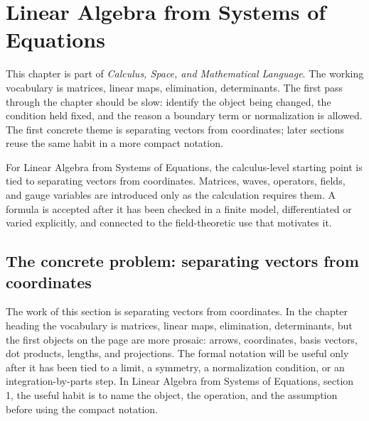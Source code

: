 \chapter{Linear Algebra from Systems of Equations}


This chapter is part of \emph{Calculus, Space, and Mathematical Language}.  The working vocabulary is matrices, linear maps, elimination, determinants.  The first pass through the chapter should be slow: identify the object being changed, the condition held fixed, and the reason a boundary term or normalization is allowed.  The first concrete theme is separating vectors from coordinates; later sections reuse the same habit in a more compact notation.

For Linear Algebra from Systems of Equations, the calculus-level starting point is tied to separating vectors from coordinates.  Matrices, waves, operators, fields, and gauge variables are introduced only as the calculation requires them.  A formula is accepted after it has been checked in a finite model, differentiated or varied explicitly, and connected to the field-theoretic use that motivates it.

\section{The concrete problem: separating vectors from coordinates}













The work of this section is separating vectors from coordinates.  In the chapter heading the vocabulary is matrices, linear maps, elimination, determinants, but the first objects on the page are more prosaic: arrows, coordinates, basis vectors, dot products, lengths, and projections.  The formal notation will be useful only after it has been tied to a limit, a symmetry, a normalization condition, or an integration-by-parts step.  In Linear Algebra from Systems of Equations, section 1, the useful habit is to name the object, the operation, and the assumption before using the compact notation.

